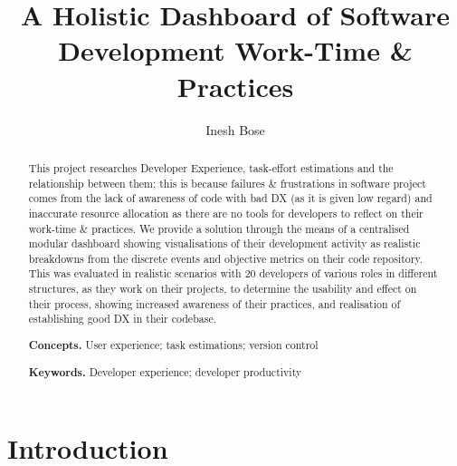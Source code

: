 \documentclass{mpaper}
\begin{document}

\title{%
    A Holistic Dashboard of Software%
    \vskip4pt%
    Development Work-Time \& Practices%
}
\author{Inesh Bose}
\date{} %

\maketitle


\begin{abstract}
This project researches Developer Experience, task-effort estimations and the relationship between them; this is because failures \& frustrations in software project comes from the lack of awareness of code with bad DX (as it is given low regard) and inaccurate resource allocation as there are no tools for developers to reflect on their work-time \& practices. We provide a solution through the means of a centralised modular dashboard showing visualisations of their development activity as realistic breakdowns from the discrete events and objective metrics on their code repository. This was evaluated in realistic scenarios with 20 developers of various roles in different structures, as they work on their projects, to determine the usability and effect on their process, showing increased awareness of their practices, and realisation of establishing good DX in their codebase. %

\vskip6pt \noindent
{\bf Concepts.} User experience; task estimations; version control

\vskip4pt \noindent
{\bf Keywords.} Developer experience; developer productivity %
\end{abstract}


\section{Introduction}\label{sec:Introduction}

\end{document}
